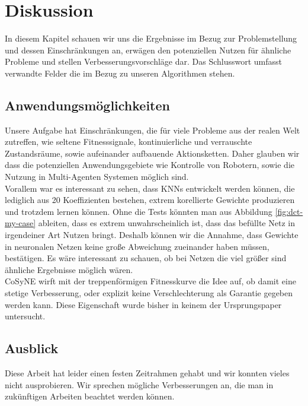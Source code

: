 \chapter{Diskussion}
    In diesem Kapitel schauen wir uns die Ergebnisse im Bezug zur Problemstellung und dessen Einschränkungen an, erwägen den potenziellen Nutzen für ähnliche Probleme und stellen Verbesserungsvorschläge dar. Das Schlusswort umfasst verwandte Felder die im Bezug zu unseren Algorithmen stehen.
    \section{Anwendungsmöglichkeiten}
        Unsere Aufgabe hat Einschränkungen, die für viele Probleme aus der realen Welt zutreffen, wie seltene Fitnesssignale, kontinuierliche und verrauschte Zustandsräume, sowie aufeinander aufbauende Aktionsketten. Daher glauben wir dass die potenziellen Anwendungsgebiete wie Kontrolle von Robotern, sowie die Nutzung in Multi-Agenten Systemen möglich sind.\\

        \noindent
        Vorallem war es interessant zu sehen, dass KNNs entwickelt werden können, die lediglich aus 20 Koeffizienten bestehen, extrem korellierte Gewichte produzieren und trotzdem lernen können. Ohne die Tests könnten man aus Abbildung \ref{fig:dct-my-case} ableiten, dass es extrem unwahrscheinlich ist, dass das befüllte Netz in irgendeiner Art Nutzen bringt. Deshalb können wir die Annahme, dass Gewichte in neuronalen Netzen keine große Abweichung zueinander haben müssen, bestätigen. Es wäre interessant zu schauen, ob bei Netzen die viel größer sind ähnliche Ergebnisse möglich wären. \\

        \noindent
        CoSyNE wirft mit der treppenförmigen Fitnesskurve die Idee auf, ob damit eine stetige Verbesserung, oder explizit keine Verschlechterung als Garantie gegeben werden kann. Diese Eigenschaft wurde bisher in keinem der Ursprungspaper untersucht.

\newpage

    \section{Ausblick}
        Diese Arbeit hat leider einen festen Zeitrahmen gehabt und wir konnten vieles nicht ausprobieren. Wir sprechen mögliche Verbesserungen an, die man in zukünftigen Arbeiten beachtet werden können.

